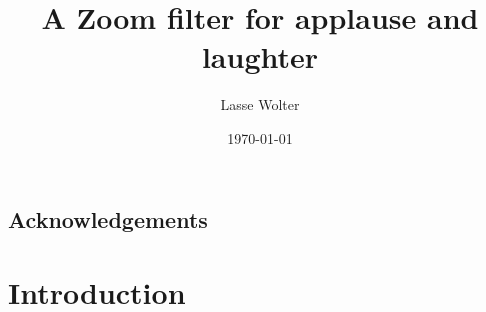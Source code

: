 \documentclass[bsc,frontabs,parskip,deptreport]{infthesis}
\begin{document}
\begin{preliminary}
\title{A Zoom filter for applause and laughter}

\author{Lasse Wolter}



\date{\today}


\maketitle

\section*{Acknowledgements}


\tableofcontents
\end{preliminary}



\chapter{Introduction}
\end{document}
